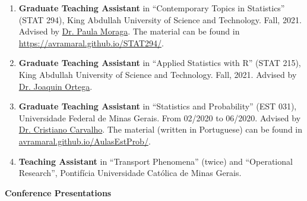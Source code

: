 \documentclass[11pt, ]{article}
\begin{document}
	\begin{enumerate}
		\item \textbf{Graduate Teaching Assistant} in ``Contemporary Topics in Statistics'' (STAT 294), King Abdullah University of Science and Technology. Fall, 2021. Advised by \href{https://cemse.kaust.edu.sa/people/person/joaquin-ortega-sanchez}{Dr. Paula Moraga}. The material can be found in \href{https://avramaral.github.io/STAT294/}{https://avramaral.github.io/STAT294/}.
		
		\item \textbf{Graduate Teaching Assistant} in ``Applied Statistics with R'' (STAT 215), King Abdullah University of Science and Technology. Fall, 2021. Advised by \href{http://www.est.ufmg.br/~cristianocs/}{Dr. Joaquin Ortega}.
		
		\item \textbf{Graduate Teaching Assistant} in ``Statistics and Probability'' (EST 031), Universidade Federal de Minas Gerais. From 02/2020 to 06/2020. Advised by \href{http://www.est.ufmg.br/~cristianocs/}{Dr. Cristiano Carvalho}. The material (written in Portuguese) can be found in \href{https://avramaral.github.io/AulasEstProb/}{avramaral.github.io/AulasEstProb/}.
		
		\item \textbf{Teaching Assistant} in ``Transport Phenomena'' (twice) and ``Operational Research'', Pontifícia Universidade Católica de Minas Gerais.
	\end{enumerate}

\vspace{6pt}

%
%

%
%

{\Large \textbf{Conference Presentations}}
\end{document}
